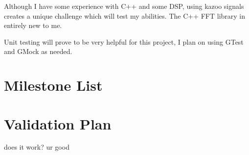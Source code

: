 \documentclass[]{article}
\begin{document}
Although I have some experience with C++ and some DSP, using kazoo signals creates
a unique challenge which will test my abilities. The C++ FFT library in entirely
new to me.

Unit testing will prove to be very helpful for this project, I plan on using
GTest and GMock as needed.

\section{Milestone List}

\section{Validation Plan}

does it work? ur good
\end{document}
